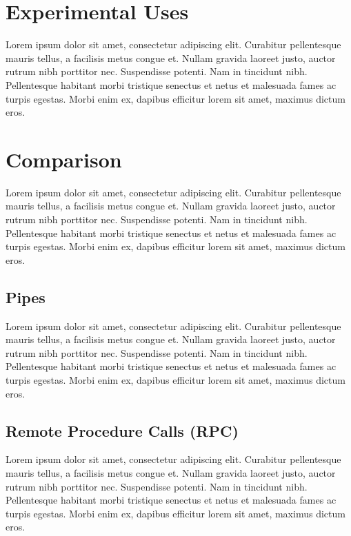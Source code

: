 \documentclass[conference, 12pt]{IEEEtran}
\begin{document}
\section{Experimental Uses}
Lorem ipsum dolor sit amet, consectetur adipiscing elit. Curabitur pellentesque mauris tellus, a facilisis metus congue et. Nullam gravida laoreet justo, auctor rutrum nibh porttitor nec. Suspendisse potenti. Nam in tincidunt nibh. Pellentesque habitant morbi tristique senectus et netus et malesuada fames ac turpis egestas. Morbi enim ex, dapibus efficitur lorem sit amet, maximus dictum eros. 

\section{Comparison}
Lorem ipsum dolor sit amet, consectetur adipiscing elit. Curabitur pellentesque mauris tellus, a facilisis metus congue et. Nullam gravida laoreet justo, auctor rutrum nibh porttitor nec. Suspendisse potenti. Nam in tincidunt nibh. Pellentesque habitant morbi tristique senectus et netus et malesuada fames ac turpis egestas. Morbi enim ex, dapibus efficitur lorem sit amet, maximus dictum eros. 

\subsection{Pipes}
Lorem ipsum dolor sit amet, consectetur adipiscing elit. Curabitur pellentesque mauris tellus, a facilisis metus congue et. Nullam gravida laoreet justo, auctor rutrum nibh porttitor nec. Suspendisse potenti. Nam in tincidunt nibh. Pellentesque habitant morbi tristique senectus et netus et malesuada fames ac turpis egestas. Morbi enim ex, dapibus efficitur lorem sit amet, maximus dictum eros. 

\subsection{Remote Procedure Calls (RPC)}
Lorem ipsum dolor sit amet, consectetur adipiscing elit. Curabitur pellentesque mauris tellus, a facilisis metus congue et. Nullam gravida laoreet justo, auctor rutrum nibh porttitor nec. Suspendisse potenti. Nam in tincidunt nibh. Pellentesque habitant morbi tristique senectus et netus et malesuada fames ac turpis egestas. Morbi enim ex, dapibus efficitur lorem sit amet, maximus dictum eros. 
\end{document}
